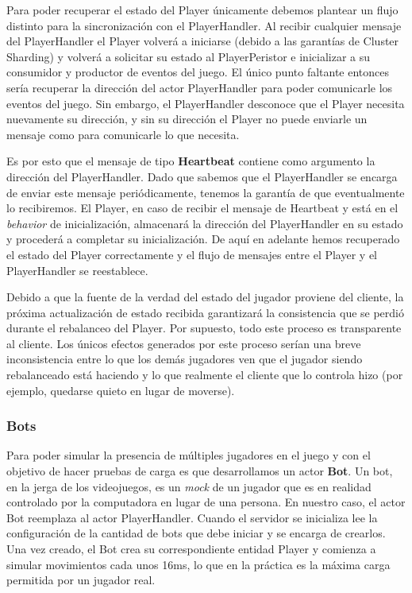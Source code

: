 Para poder recuperar el estado del Player únicamente debemos plantear un flujo distinto para la sincronización con el PlayerHandler. Al recibir cualquier mensaje del PlayerHandler el Player volverá a iniciarse (debido a las garantías de Cluster Sharding)
y volverá a solicitar su estado al PlayerPeristor e inicializar a su consumidor y productor de eventos del juego. El único punto faltante entonces sería recuperar la dirección del actor PlayerHandler para poder comunicarle los eventos del juego.
Sin embargo, el PlayerHandler desconoce que el Player necesita nuevamente su dirección, y sin su dirección el Player no puede enviarle un mensaje como para comunicarle lo que necesita.

Es por esto que el mensaje de tipo \textbf{Heartbeat} contiene como argumento la dirección del PlayerHandler. Dado que sabemos que el PlayerHandler se encarga de enviar este mensaje periódicamente, tenemos la garantía de que eventualmente lo recibiremos.
El Player, en caso de recibir el mensaje de Heartbeat y está en el \textit{behavior} de inicialización, almacenará la dirección del PlayerHandler en su estado y procederá a completar su inicialización. De aquí en adelante hemos recuperado el estado del Player
correctamente y el flujo de mensajes entre el Player y el PlayerHandler se reestablece.

Debido a que la fuente de la verdad del estado del jugador proviene del cliente, la próxima actualización de estado recibida garantizará la consistencia que se perdió durante el rebalanceo del Player.
Por supuesto, todo este proceso es transparente al cliente. Los únicos efectos generados por este proceso serían una breve inconsistencia entre lo que los demás jugadores ven que el jugador siendo rebalanceado está haciendo y lo que realmente el cliente que lo controla
hizo (por ejemplo, quedarse quieto en lugar de moverse).

\subsubsection{Bots}
\label{sec:Bots}

\noindent Para poder simular la presencia de múltiples jugadores en el juego y con el objetivo de hacer pruebas de carga es que
desarrollamos un actor \textbf{Bot}. Un bot, en la jerga de los videojuegos, es un \textit{mock} de un jugador que es en realidad controlado
por la computadora en lugar de una persona. En nuestro caso, el actor Bot reemplaza al actor PlayerHandler. Cuando el servidor se inicializa
lee la configuración de la cantidad de bots que debe iniciar y se encarga de crearlos. Una vez creado, el Bot crea su correspondiente entidad Player
y comienza a simular movimientos cada unos 16ms, lo que en la práctica es la máxima carga permitida por un jugador real.


